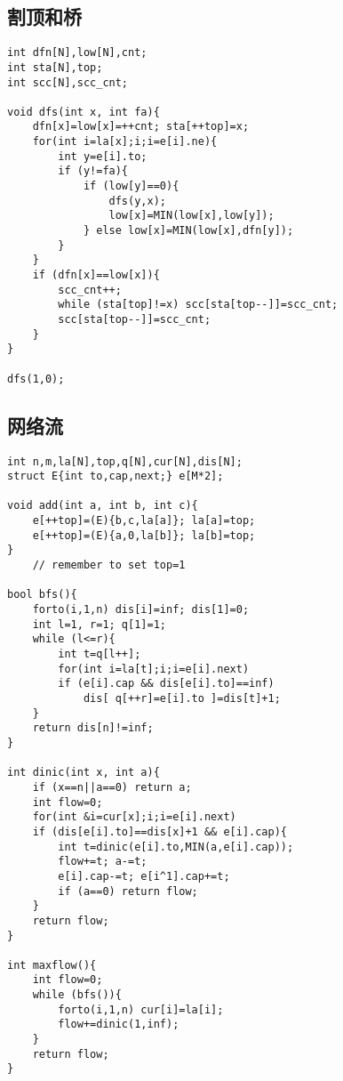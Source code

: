 \documentclass{article}
\begin{document}
\subsection{割顶和桥}
\begin{lstlisting}
int dfn[N],low[N],cnt;
int sta[N],top;
int scc[N],scc_cnt;

void dfs(int x, int fa){
	dfn[x]=low[x]=++cnt; sta[++top]=x;
	for(int i=la[x];i;i=e[i].ne){
		int y=e[i].to;
		if (y!=fa){
			if (low[y]==0){
				dfs(y,x);
				low[x]=MIN(low[x],low[y]);
			} else low[x]=MIN(low[x],dfn[y]);
		}
	}
	if (dfn[x]==low[x]){
		scc_cnt++;
		while (sta[top]!=x) scc[sta[top--]]=scc_cnt;
		scc[sta[top--]]=scc_cnt;
	}	
}

dfs(1,0);
\end{lstlisting}

\subsection{网络流}
\begin{lstlisting}
int n,m,la[N],top,q[N],cur[N],dis[N];
struct E{int to,cap,next;} e[M*2];

void add(int a, int b, int c){
	e[++top]=(E){b,c,la[a]}; la[a]=top;
	e[++top]=(E){a,0,la[b]}; la[b]=top;
}
	// remember to set top=1

bool bfs(){
	forto(i,1,n) dis[i]=inf; dis[1]=0;
	int l=1, r=1; q[1]=1;
	while (l<=r){
		int t=q[l++];
		for(int i=la[t];i;i=e[i].next)
		if (e[i].cap && dis[e[i].to]==inf)
			dis[ q[++r]=e[i].to ]=dis[t]+1;
	}
	return dis[n]!=inf;
}

int dinic(int x, int a){
	if (x==n||a==0) return a;
	int flow=0;
	for(int &i=cur[x];i;i=e[i].next)
	if (dis[e[i].to]==dis[x]+1 && e[i].cap){
		int t=dinic(e[i].to,MIN(a,e[i].cap));
		flow+=t; a-=t;
		e[i].cap-=t; e[i^1].cap+=t;
		if (a==0) return flow;
	}
	return flow;
}

int maxflow(){
	int flow=0;
	while (bfs()){
		forto(i,1,n) cur[i]=la[i];
		flow+=dinic(1,inf);
	}
	return flow;
}
\end{lstlisting}
\end{document}
